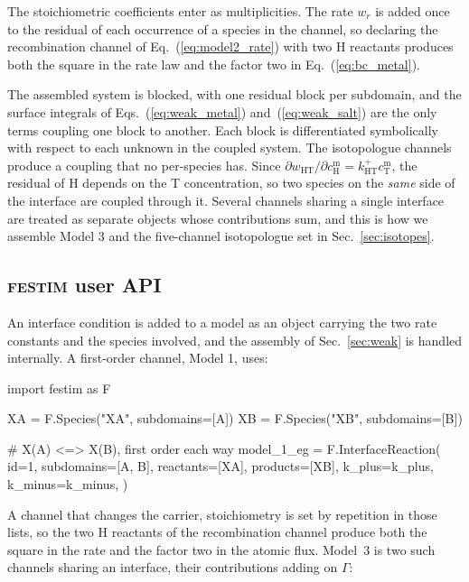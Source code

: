 \documentclass[5p]{elsarticle}
\newcommand{\FESTIM}{\textsc{festim}}
\newcommand{\cm}[1]{c^{\mathrm{m}}_{#1}}   %
\begin{document}
The stoichiometric coefficients enter as multiplicities. 
The rate $w_r$ is added once to the residual of each occurrence of a species in the channel, so declaring the recombination channel of Eq.~(\ref{eq:model2_rate}) with two H reactants produces both the square in the rate law and the factor two in Eq.~(\ref{eq:bc_metal}).

The assembled system is blocked, with one residual block per subdomain, and the surface integrals of Eqs.~(\ref{eq:weak_metal}) and~(\ref{eq:weak_salt}) are the only terms coupling one block to another.
Each block is differentiated symbolically with respect to each unknown in the coupled system. 
The isotopologue channels produce a coupling that no per-species has.
Since $\partial w_\mathrm{HT}/\partial \cm{\mathrm{H}} = k^{+}_\mathrm{HT}\cm{\mathrm{T}}$, the residual of H depends on the T concentration, so two species on the \emph{same} side of the interface are coupled through it.
Several channels sharing a single interface are treated as separate objects whose contributions sum, and this is how we assemble Model 3 and the five-channel isotopologue set in Sec.~\ref{sec:isotopes}.

\subsection{\FESTIM{} user API}
\label{sec:user_api}

An interface condition is added to a model as an object carrying the two rate constants and the species involved, and the assembly of Sec.~\ref{sec:weak} is handled internally.
A first-order channel, Model 1, uses:

\begin{python}
import festim as F

XA  = F.Species("XA",  subdomains=[A])
XB = F.Species("XB", subdomains=[B])

# X(A) <=> X(B), first order each way
model_1_eg = F.InterfaceReaction(
    id=1,
    subdomains=[A, B],
    reactants=[XA],
    products=[XB],
    k_plus=k_plus,
    k_minus=k_minus,
)
\end{python}

A channel that changes the carrier, stoichiometry is set by repetition in those lists, so the two H reactants of the recombination channel produce both the square in the rate and the factor two in the atomic flux.
Model~3 is two such channels sharing an interface, their contributions adding on $\Gamma$:
\end{document}
